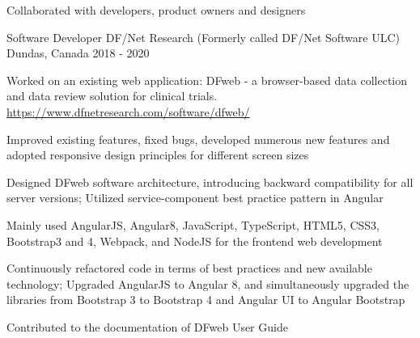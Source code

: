 \begin{cventries}
{\begin{cvitems}
		{Collaborated with developers, product owners and designers}
	\end{cvitems}
}




  \cventry
{Software Developer} %
{DF/Net Research (Formerly called DF/Net Software ULC)} %
{Dundas, Canada} %
{2018 - 2020} %
{Worked on an existing web application: DFweb -  a browser-based data collection and data review solution for clinical trials. \href{https://www.dfnetresearch.com/software/dfweb/}{https://www.dfnetresearch.com/software/dfweb/}
\vspace{6.0mm}
\begin{cvitems}
		\item
		{Improved existing features, fixed bugs, developed numerous new features and adopted responsive design principles for different screen sizes}
		\item
		{Designed DFweb software architecture, introducing backward compatibility for all server versions; Utilized service-component best practice pattern in Angular}
		\item
		{Mainly used AngularJS, Angular8, JavaScript, TypeScript, HTML5, CSS3, Bootstrap3 and 4, Webpack, and NodeJS for the frontend web development}
		\item
		{Continuously refactored code in terms of best practices and new available technology; Upgraded AngularJS to Angular 8, and simultaneously upgraded the libraries from Bootstrap 3 to Bootstrap 4 and Angular UI to Angular Bootstrap }
		\item
		{Contributed to the documentation of DFweb User Guide}
	\end{cvitems}
}

	




\end{cventries}
